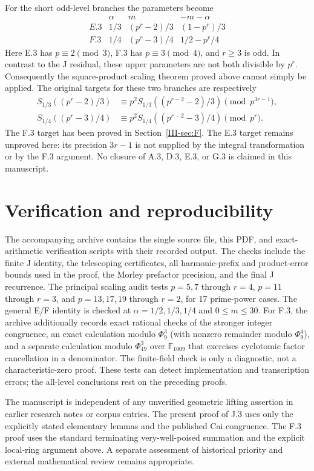 \documentclass[11pt,letterpaper]{article}
\numberwithin{equation}{section}
\begin{document}
For the short odd-level branches the parameters become
\[
 \begin{array}{c|c|c|c}
 &\alpha&m&-m-\alpha\\\hline
 E.3&1/3&(p^r-2)/3&(1-p^r)/3\\
 F.3&1/4&(p^r-3)/4&1/2-p^r/4
 \end{array}
\]
Here E.3 has $p\equiv2\pmod3$, F.3 has $p\equiv3\pmod4$,
and $r\ge3$ is odd. In contrast to the J residual, these upper
parameters are not both divisible by $p^r$. Consequently the
square-product scaling theorem proved above cannot simply be applied.
The original targets for these two branches are respectively
\[
 \begin{aligned}
 S_{1/3}((p^r-2)/3)&\equiv
 p^2S_{1/3}((p^{r-2}-2)/3)\pmod{p^{3r-1}},\\
 S_{1/4}((p^r-3)/4)&\equiv
 p^2S_{1/4}((p^{r-2}-3)/4)\pmod{p^r}.
 \end{aligned}
\]
The F.3 target has been proved in Section~\ref{III-sec:F}. The E.3 target
remains unproved here: its precision $3r-1$ is not supplied by the
integral transformation or by the F.3 argument. No closure of A.3,
D.3, E.3, or G.3 is claimed in this manuscript.

\section{Verification and reproducibility}\label{loc-III-B}
The accompanying archive contains the single source file, this PDF,
and exact-arithmetic verification scripts with their recorded output.
The checks include the finite J identity, the telescoping certificates,
all harmonic-prefix and product-error bounds used in the proof, the
Morley prefactor precision, and the final J recurrence. The principal
scaling audit tests $p=5,7$ through $r=4$, $p=11$ through $r=3$,
and $p=13,17,19$ through $r=2$, for 17 prime-power cases. The
general E/F identity is checked at $\alpha=1/2,1/3,1/4$ and
$0\le m\le30$. For F.3, the archive additionally records exact rational checks of
the stronger integer congruence, an exact calculation modulo
$\Phi_9^3$ (with nonzero remainder modulo $\Phi_9^4$), and a separate
calculation modulo $\Phi_{49}^3$ over $\mathbb F_{1009}$ that exercises
cyclotomic factor cancellation in a denominator. The finite-field
check is only a diagnostic, not a characteristic-zero proof.
These tests can detect implementation and transcription errors; the all-level conclusions rest on the preceding proofs.

The manuscript is independent of any unverified geometric lifting
assertion in earlier research notes or corpus entries. The present
proof of J.3 uses only the explicitly stated elementary lemmas and
the published Cai congruence. The F.3 proof uses the standard
terminating very-well-poised summation and the explicit local-ring
argument above. A separate assessment of historical
priority and external mathematical review remains appropriate.
\end{document}
